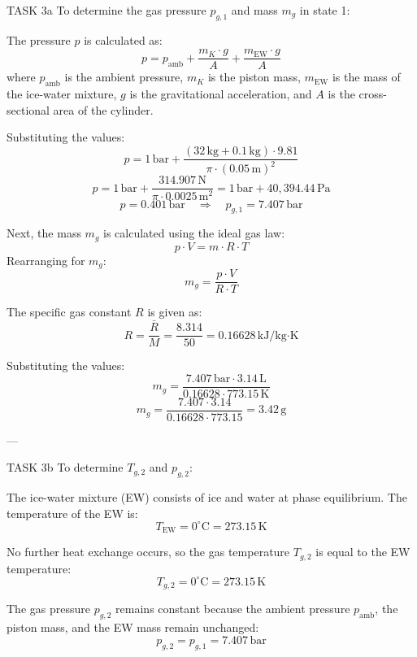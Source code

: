 TASK 3a  
To determine the gas pressure \( p_{g,1} \) and mass \( m_g \) in state 1:  

The pressure \( p \) is calculated as:  
\[
p = p_{\text{amb}} + \frac{m_K \cdot g}{A} + \frac{m_{\text{EW}} \cdot g}{A}
\]  
where \( p_{\text{amb}} \) is the ambient pressure, \( m_K \) is the piston mass, \( m_{\text{EW}} \) is the mass of the ice-water mixture, \( g \) is the gravitational acceleration, and \( A \) is the cross-sectional area of the cylinder.  

Substituting the values:  
\[
p = 1 \, \text{bar} + \frac{(32 \, \text{kg} + 0.1 \, \text{kg}) \cdot 9.81}{\pi \cdot (0.05 \, \text{m})^2}
\]  
\[
p = 1 \, \text{bar} + \frac{314.907 \, \text{N}}{\pi \cdot 0.0025 \, \text{m}^2} = 1 \, \text{bar} + 40,394.44 \, \text{Pa}
\]  
\[
p = 0.401 \, \text{bar} \quad \Rightarrow \quad p_{g,1} = 7.407 \, \text{bar}
\]  

Next, the mass \( m_g \) is calculated using the ideal gas law:  
\[
p \cdot V = m \cdot R \cdot T
\]  
Rearranging for \( m_g \):  
\[
m_g = \frac{p \cdot V}{R \cdot T}
\]  

The specific gas constant \( R \) is given as:  
\[
R = \frac{\bar{R}}{M} = \frac{8.314}{50} = 0.16628 \, \text{kJ/kg·K}
\]  

Substituting the values:  
\[
m_g = \frac{7.407 \, \text{bar} \cdot 3.14 \, \text{L}}{0.16628 \cdot 773.15 \, \text{K}}
\]  
\[
m_g = \frac{7.407 \cdot 3.14}{0.16628 \cdot 773.15} = 3.42 \, \text{g}
\]  

---

TASK 3b  
To determine \( T_{g,2} \) and \( p_{g,2} \):  

The ice-water mixture (EW) consists of ice and water at phase equilibrium. The temperature of the EW is:  
\[
T_{\text{EW}} = 0^\circ\text{C} = 273.15 \, \text{K}
\]  

No further heat exchange occurs, so the gas temperature \( T_{g,2} \) is equal to the EW temperature:  
\[
T_{g,2} = 0^\circ\text{C} = 273.15 \, \text{K}
\]  

The gas pressure \( p_{g,2} \) remains constant because the ambient pressure \( p_{\text{amb}} \), the piston mass, and the EW mass remain unchanged:  
\[
p_{g,2} = p_{g,1} = 7.407 \, \text{bar}
\]